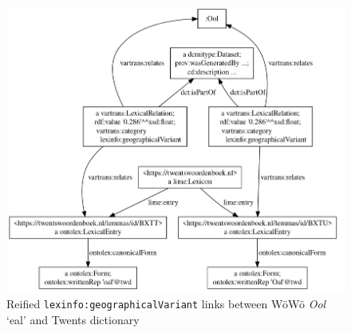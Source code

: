 \documentclass[11pt]{article}
\newcommand{\word}[1]{\textsl{#1}} %
\newcommand{\onto}[1]{\texttt{#1}} %
\begin{document}
\begin{figure}
    \centering
    \includegraphics[width=0.9\linewidth]{img/links-vis.png}
    \caption{Reified \onto{lexinfo:geographicalVariant} links between WöWö \word{Ool} `eal' and Twents dictionary}
    \label{fig-links}
\end{figure}

% 
% 
% 
% 
% 
% 
% 
% 
% 
\end{document}
